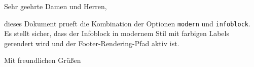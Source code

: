 \documentclass[modern, infoblock, lang=german]{../../onlinebrief24}
\begin{document}
\begin{letter}{}
\opening{Sehr geehrte Damen und Herren,}

dieses Dokument prueft die Kombination der Optionen \texttt{modern} und
\texttt{infoblock}. Es stellt sicher, dass der Infoblock in modernem Stil mit
farbigen Labels gerendert wird und der Footer-Rendering-Pfad aktiv ist.

\closing{Mit freundlichen Gr\"u\ss{}en}
\end{letter}
\end{document}
